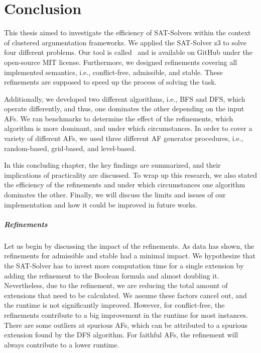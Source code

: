 \chapter{Conclusion}
This thesis aimed to investigate the efficiency of SAT-Solvers within the context of clustered argumentation frameworks. We applied the SAT-Solver z3 to solve four different problems. Our tool is called \prog\ and is available on GitHub under the open-source MIT license. Furthermore, we designed refinements covering all implemented semantics, i.e., conflict-free, admissible, and stable. These refinements are supposed to speed up the process of solving the task.

Additionally, we developed two different algorithms, i.e., BFS and DFS, which operate differently, and thus, one dominates the other depending on the input AFs. We ran benchmarks to determine the effect of the refinements, which algorithm is more dominant, and under which circumstances. In order to cover a variety of different AFs, we used three different AF generator procedures, i.e., random-based, grid-based, and level-based.

In this concluding chapter, the key findings are summarized, and their implications of practicality are discussed. To wrap up this research, we also stated the efficiency of the refinements and under which circumstances one algorithm dominates the other. Finally, we will discuss the limits and issues of our implementation and how it could be improved in future works.

\paragraph{Refinements} Let us begin by discussing the impact of the refinements. As data has shown, the refinements for admissible and stable had a minimal impact. We hypothesize that the SAT-Solver has to invest more computation time for a single extension by adding the refinement to the Boolean formula and almost doubling it. Nevertheless, due to the refinement, we are reducing the total amount of extensions that need to be calculated. We assume these factors cancel out, and the runtime is not significantly improved. However, for conflict-free, the refinements contribute to a big improvement in the runtime for most instances. There are some outliers at spurious AFs, which can be attributed to a spurious extension found by the DFS algorithm. For faithful AFs, the refinement will always contribute to a lower runtime.


